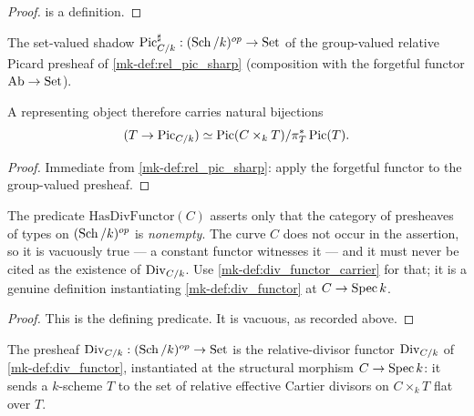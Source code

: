 \begin{proof}
  \leanokThis is a definition.
\end{proof}

\begin{definition}\label{mk-def:pic_sharp_carrier}
  \leanok

  The set-valued shadow \(\operatorname{Pic}^\sharp_{C/k} : (\operatorname{Sch}/k)^{op} \to \mathrm{Set}\) of the
  group-valued relative Picard presheaf of \ref{mk-def:rel_pic_sharp}
  (composition with the forgetful functor \(\mathrm{Ab} \to \mathrm{Set}\)).

  A representing object therefore carries natural bijections
  \[
    (T \to \operatorname{Pic}_{C/k}) \simeq
    \operatorname{Pic}(C \times_k T)/\pi_T^*\operatorname{Pic}(T).
  \]
\end{definition}

\begin{proof}
  \leanok{}
  Immediate from \ref{mk-def:rel_pic_sharp}: apply the forgetful functor to
  the group-valued presheaf.
\end{proof}

\begin{definition}
  \label{mk-def:has_div_functor}
  \leanok

  The predicate \(\mathrm{HasDivFunctor}(C)\) asserts only that the category of
  presheaves of types on \((\operatorname{Sch}/k)^{op}\) is \emph{nonempty}. The curve \(C\)
  does not occur in the assertion, so it is vacuously true --- a constant functor
  witnesses it --- and it must never be cited as the existence of
  \(\operatorname{Div}_{C/k}\). Use \ref{mk-def:div_functor_carrier} for that; it is a genuine
  definition instantiating \ref{mk-def:div_functor} at \(C \to \operatorname{Spec} k\).
\end{definition}

\begin{proof}
  This is the defining predicate. It is vacuous, as recorded above.
\end{proof}

\begin{definition}\label{mk-def:div_functor_carrier}
  \leanok

  The presheaf \(\mathrm{Div}_{C/k} : (\operatorname{Sch}/k)^{op} \to \mathrm{Set}\) is the
  relative-divisor functor \(\operatorname{Div}_{C/k}\) of \ref{mk-def:div_functor},
  instantiated at the structural morphism \(C \to \operatorname{Spec} k\): it sends a
  \(k\)-scheme \(T\) to the set of relative effective Cartier divisors on
  \(C \times_k T\) flat over \(T\).
\end{definition}

